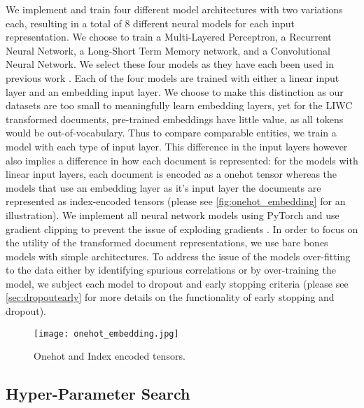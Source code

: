 We implement and train four different model architectures with two variations each, resulting in a total of 8 different neural models for each input representation. We choose to train a Multi-Layered Perceptron, a Recurrent Neural Network, a Long-Short Term Memory network, and a Convolutional Neural Network. We select these four models as they have each been used in previous work \cite{CITE: Find papers with Neural approaches for each of the models}. Each of the four models are trained with either a linear input layer and an embedding input layer. We choose to make this distinction as our datasets are too small to meaningfully learn embedding layers, yet for the LIWC transformed documents, pre-trained embeddings have little value, as all tokens would be out-of-vocabulary. Thus to compare comparable entities, we train a model with each type of input layer. This difference in the input layers however also implies a difference in how each document is represented: for the models with linear input layers, each document is encoded as a onehot tensor whereas the models that use an embedding layer as it's input layer the documents are represented as index-encoded tensors (please see \autoref{fig:onehot_embedding} for an illustration). We implement all neural network models using PyTorch \cite{CITE: Pytorch paper} and use gradient clipping to prevent the issue of exploding gradients \cite{Bengio:1994}.
In order to focus on the utility of the transformed document representations, we use bare bones models with simple architectures. To address the issue of the models over-fitting to the data either by identifying spurious correlations or by over-training the model, we subject each model to dropout and early stopping criteria (please see \autoref{sec:dropoutearly} for more details on the functionality of early stopping and dropout).

\begin{figure}
  \centering
  \texttt{[image: onehot\_embedding.jpg]}
  \caption{Onehot and Index encoded tensors.}
  \label{fig:onehot_embedding}
\end{figure}

\subsection{Hyper-Parameter Search}


